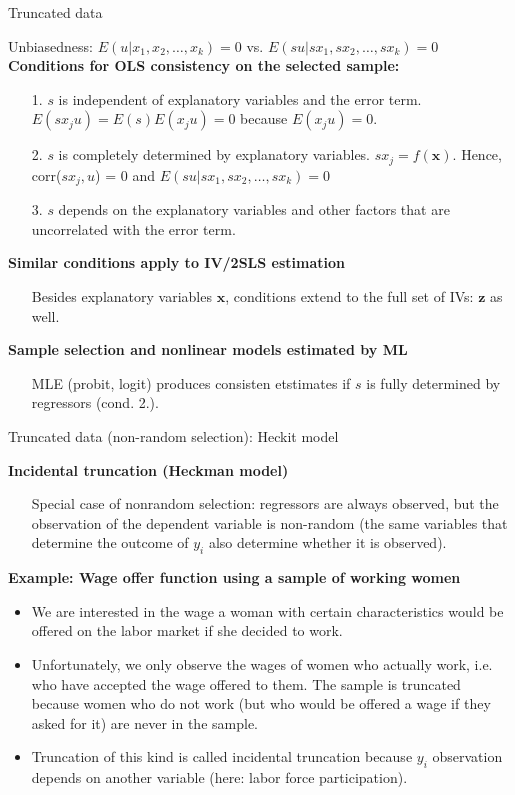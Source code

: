 \documentclass[usenames,dvipsnames]{beamer}
\begin{document}
\begin{frame}{Truncated data}

{\small
Unbiasedness: $E(u|x_1,x_2,\dots,x_k)=0$ vs. $E(su|sx_1,sx_2,\dots,sx_k)=0$\\
\medskip
\textbf{Conditions for OLS consistency on the selected sample:} \\
\begin{itemize}
\item[1.] $s$ is independent of explanatory variables and the error term.\\$E(sx_ju)=E(s)E(x_ju) = 0$ because $E(x_ju) = 0$.
\item[2.] $s$ is completely determined by explanatory variables. $sx_j = f(\bm{x})$. Hence, corr($sx_j,u$) = 0 and $E(su|sx_1,sx_2,\dots,sx_k)=0$
\item[3.] $s$ depends on the explanatory variables and other factors that are uncorrelated with the error term.
\end{itemize}
\textbf{Similar conditions apply to IV/2SLS estimation}
\begin{itemize}
\item[] Besides explanatory variables $\bm{x}$, conditions extend to the full set of IVs: $\bm{z}$ as well.
\end{itemize}
\textbf{Sample selection and nonlinear models estimated by ML}
\begin{itemize}
\item[] MLE (probit, logit) produces consisten etstimates if $s$ is fully determined by regressors (cond. 2.).
\end{itemize}}
\end{frame}
\begin{frame}{Truncated data (non-random selection): Heckit model}

{\footnotesize
\textbf{Incidental truncation (Heckman model)}
\begin{itemize}
\item[] Special case of nonrandom selection: regressors are always observed, but the observation of the dependent variable is non-random (the same variables that determine the outcome of $y_i$ also determine whether it is observed).
\end{itemize}
\bigskip
\textbf{Example: Wage offer function using a sample of working women}
\begin{itemize}
\item We are interested in the wage a woman with certain characteristics would be offered on the labor market if she decided to work.\\
\medskip
\item Unfortunately, we only observe the wages of women who actually work, i.e. who have accepted the wage offered to them. The sample is truncated because women who do not work (but who would be offered a wage if they asked for it) are never in the sample.\\
\medskip
\item Truncation of this kind is called incidental truncation because $y_i$ observation depends on another variable (here: labor force participation).
\end{itemize}}
\end{frame}
\end{document}
